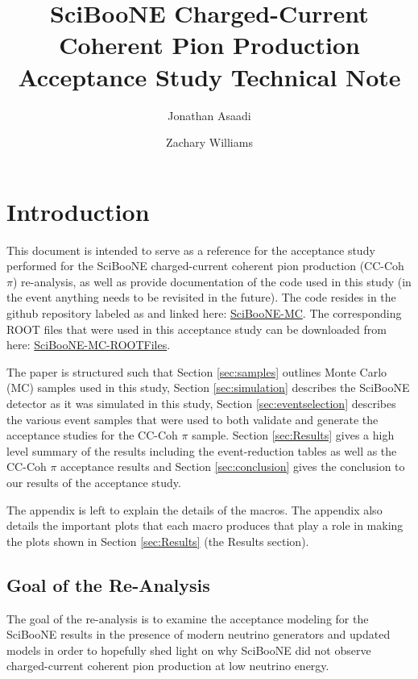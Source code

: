 \documentclass[11pt]{article}
\title{SciBooNE Charged-Current Coherent Pion Production Acceptance Study Technical Note}
\author[1]{Jonathan Asaadi}
\author[1]{Zachary Williams}
\affil[1]{Department of Physics, The University of Texas at Arlington}
\begin{document}
\begin{minipage}[h]{\textwidth}
\maketitle
\end{minipage}



\section{Introduction}
\label{sec:introduction}
This document is intended to serve as a reference for the acceptance study performed for the SciBooNE charged-current coherent pion production (CC-Coh $\pi$) re-analysis, as well as provide documentation of the code used in this study (in the event anything needs to be revisited in the future). The code resides in the github repository labeled as and linked here: \href{https://github.com/williamszg/SciBooNE-MC}{SciBooNE-MC}. The corresponding ROOT files that were used in this acceptance study can be downloaded from here: \href{https://drive.google.com/open?id=0B4rvJl9swUOxcEtpSl94RDRsc3c}{SciBooNE-MC-ROOTFiles}.

The paper is structured such that Section \ref*{sec:samples} outlines Monte Carlo (MC) samples used in this study, Section \ref*{sec:simulation} describes the SciBooNE detector as it was simulated in this study, Section \ref*{sec:eventselection} describes the various event samples that were used to both validate and generate the acceptance studies for the CC-Coh $\pi$ sample. Section \ref*{sec:Results} gives a high level summary of the results including the event-reduction tables as well as the CC-Coh $\pi$ acceptance results and Section \ref*{sec:conclusion} gives the conclusion to our results  of the acceptance study.

The appendix is left to explain the details of the macros. The appendix also details the important plots that each macro produces that play a role in making the plots shown in Section \ref*{sec:Results} (the Results section).

\subsection{Goal of the Re-Analysis}
\label{sub:goals}
The goal of the re-analysis is to examine the acceptance modeling for the SciBooNE results in the presence of modern neutrino generators and updated models in order to hopefully shed light on why SciBooNE did not observe charged-current coherent pion production at low neutrino energy.
\end{document}
